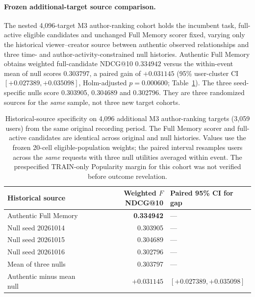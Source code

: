 \paragraph{Frozen additional-target source comparison.}
The nested 4,096-target M3 author-ranking cohort holds the incumbent task, full-active eligible candidates and unchanged Full Memory scorer fixed, varying only the historical viewer--creator source between authentic observed relationships and three time- and author-activity-constrained null histories. Authentic Full Memory obtains weighted full-candidate NDCG@10 $0.334942$ versus the within-event mean of null scores $0.303797$, a paired gain of $+0.031145$ (95\% user-cluster CI $[+0.027389,+0.035098]$, Holm-adjusted $p=0.000600$; Table~\ref{tab:results-m3-additional-relation-identity}). The three seed-specific nulls score 0.303905, 0.304689 and 0.302796. They are three randomized sources for the \emph{same} sample, not three new target cohorts.

\begin{table}[!htbp]
\centering
\caption{Historical-source specificity on 4,096 additional M3 author-ranking targets (3,059 users) from the same original recording period. The Full Memory scorer and full-active candidates are identical across original and null histories. Values use the frozen 20-cell eligible-population weights; the paired interval resamples users across the \emph{same} requests with three null utilities averaged within event. The prespecified TRAIN-only Popularity margin for this cohort was not verified before outcome revelation.}
\label{tab:results-m3-additional-relation-identity}
\footnotesize
\setlength{\tabcolsep}{5pt}
\begin{tabular}{@{}lrl@{}}
\toprule
Historical source & Weighted $F$ NDCG@10 & Paired 95\% CI for gap \\
\midrule
Authentic Full Memory & \textbf{0.334942} & --- \\
Null seed 20261014 & 0.303905 & --- \\
Null seed 20261015 & 0.304689 & --- \\
Null seed 20261016 & 0.302796 & --- \\
Mean of three nulls & 0.303797 & --- \\
Authentic minus mean null & $\mathbf{+0.031145}$ & $[+0.027389,+0.035098]$ \\
\bottomrule
\end{tabular}
\end{table}

